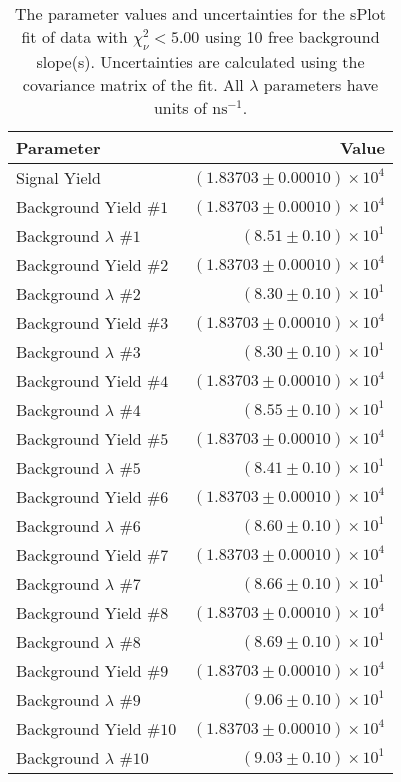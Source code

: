 
\begin{table}
    \begin{center}
        \begin{tabular}{lr}\toprule
            Parameter & Value \\\midrule
            Signal Yield & $(1.83703 \pm 0.00010) \times 10^{4}$ \\
            Background Yield $\#1$ & $(1.83703 \pm 0.00010) \times 10^{4}$ \\
            Background $\lambda$ $\#1$ & $(8.51 \pm 0.10) \times 10^{1}$ \\
            Background Yield $\#2$ & $(1.83703 \pm 0.00010) \times 10^{4}$ \\
            Background $\lambda$ $\#2$ & $(8.30 \pm 0.10) \times 10^{1}$ \\
            Background Yield $\#3$ & $(1.83703 \pm 0.00010) \times 10^{4}$ \\
            Background $\lambda$ $\#3$ & $(8.30 \pm 0.10) \times 10^{1}$ \\
            Background Yield $\#4$ & $(1.83703 \pm 0.00010) \times 10^{4}$ \\
            Background $\lambda$ $\#4$ & $(8.55 \pm 0.10) \times 10^{1}$ \\
            Background Yield $\#5$ & $(1.83703 \pm 0.00010) \times 10^{4}$ \\
            Background $\lambda$ $\#5$ & $(8.41 \pm 0.10) \times 10^{1}$ \\
            Background Yield $\#6$ & $(1.83703 \pm 0.00010) \times 10^{4}$ \\
            Background $\lambda$ $\#6$ & $(8.60 \pm 0.10) \times 10^{1}$ \\
            Background Yield $\#7$ & $(1.83703 \pm 0.00010) \times 10^{4}$ \\
            Background $\lambda$ $\#7$ & $(8.66 \pm 0.10) \times 10^{1}$ \\
            Background Yield $\#8$ & $(1.83703 \pm 0.00010) \times 10^{4}$ \\
            Background $\lambda$ $\#8$ & $(8.69 \pm 0.10) \times 10^{1}$ \\
            Background Yield $\#9$ & $(1.83703 \pm 0.00010) \times 10^{4}$ \\
            Background $\lambda$ $\#9$ & $(9.06 \pm 0.10) \times 10^{1}$ \\
            Background Yield $\#10$ & $(1.83703 \pm 0.00010) \times 10^{4}$ \\
            Background $\lambda$ $\#10$ & $(9.03 \pm 0.10) \times 10^{1}$ \\\bottomrule
        \end{tabular}
        \caption{The parameter values and uncertainties for the sPlot fit of data with $\chi^2_\nu < 5.00$ using 10 free background slope(s). Uncertainties are calculated using the covariance matrix of the fit. All $\lambda$ parameters have units of $\si{\nano\second}^{-1}$.}
    \end{center}
\end{table}
